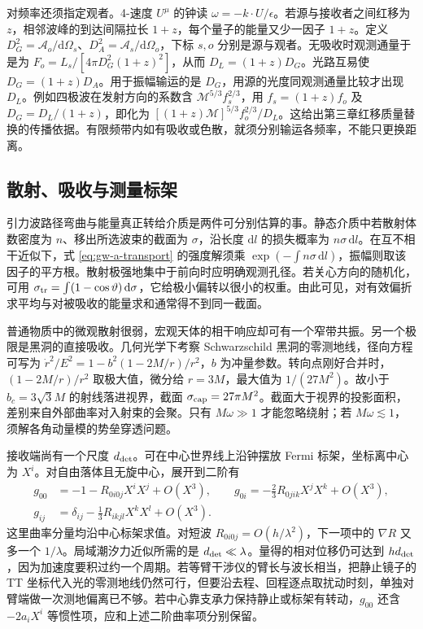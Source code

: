 对频率还须指定观者。4-速度 $U^\mu$ 的钟读 $\omega=-k\cdot U/\epsilon$。若源与接收者之间红移为 $z$，相邻波峰的到达间隔拉长 $1+z$，每个量子的能量又少一因子 $1+z$。定义 $D_G^2=\mathcal A_o/\mathrm d\Omega_s$、$D_A^2=\mathcal A_s/\mathrm d\Omega_o$，下标 $s,o$ 分别是源与观者。无吸收时观测通量于是为 $F_o=L_s/[4\pi D_G^2(1+z)^2]$，从而 $D_L=(1+z)D_G$。光路互易使 $D_G=(1+z)D_A$。用于振幅输运的是 $D_G$，用源的光度同观测通量比较才出现 $D_L$。例如四极波在发射方向的系数含 $\mathcal M^{5/3} f_s^{2/3}$，用 $f_s=(1+z)f_o$ 及 $D_G=D_L/(1+z)$，即化为 $[(1+z)\mathcal M]^{5/3} f_o^{2/3}/D_L$。这给出第三章红移质量替换的传播依据。有限频带内如有吸收或色散，就须分别输运各频率，不能只更换距离。

\subsection{散射、吸收与测量标架}

引力波路径弯曲与能量真正转给介质是两件可分别估算的事。静态介质中若散射体数密度为 $n$、移出所选波束的截面为 $\sigma$，沿长度 $\mathrm dl$ 的损失概率为 $n\sigma\,\mathrm dl$。在互不相干近似下，式 \eqref{eq:gw-a-transport} 的强度解须乘 $\exp(-\int n\sigma\,\mathrm dl)$，振幅则取该因子的平方根。散射极强地集中于前向时应明确观测孔径。若关心方向的随机化，可用 $\sigma_{\rm tr}=\int(1-\cos\vartheta)\,\mathrm d\sigma$，它给极小偏转以很小的权重。由此可见，对有效偏折求平均与对被吸收的能量求和通常得不到同一截面。

普通物质中的微观散射很弱，宏观天体的相干响应却可有一个窄带共振。另一个极限是黑洞的直接吸收。几何光学下考察 Schwarzschild 黑洞的零测地线，径向方程可写为 $\dot r^2/E^2=1-b^2(1-2M/r)/r^2$，$b$ 为冲量参数。转向点刚好合并时，$(1-2M/r)/r^2$ 取极大值，微分给 $r=3M$，最大值为 $1/(27M^2)$。故小于 $b_c=3\sqrt3 M$ 的射线落进视界，截面 $\sigma_{\rm cap}=27\pi M^2$。截面大于视界的投影面积，差别来自外部曲率对入射束的会聚。只有 $M\omega\gg1$ 才能忽略绕射；若 $M\omega\lesssim1$，须解各角动量模的势垒穿透问题。

接收端尚有一个尺度 $d_{\rm det}$。可在中心世界线上沿钟摆放 Fermi 标架，坐标离中心为 $X^i$。对自由落体且无旋中心，展开到二阶有
\begin{align*}
 g_{00}&=-1-R_{0i0j}X^iX^j+O(X^3),\qquad
 g_{0i}=-\tfrac23R_{0jik}X^jX^k+O(X^3),\\
 g_{ij}&=\delta_{ij}-\tfrac13R_{ikjl}X^kX^l+O(X^3).
\end{align*}
这里曲率分量均沿中心标架求值。对短波 $R_{0i0j}=O(h/\lambda^2)$，下一项中的 $\nabla R$ 又多一个 $1/\lambda$。局域潮汐力近似所需的是 $d_{\rm det}\ll\lambda$。量得的相对位移仍可达到 $h d_{\rm det}$，因为加速度要积过约一个周期。若等臂干涉仪的臂长与波长相当，把静止镜子的 TT 坐标代入光的零测地线仍然可行，但要沿去程、回程逐点取扰动时刻，单独对臂端做一次测地偏离已不够。若中心靠支承力保持静止或标架有转动，$g_{00}$ 还含 $-2a_iX^i$ 等惯性项，应和上述二阶曲率项分别保留。

